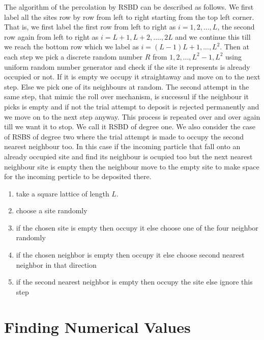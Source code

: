 The algorithm of the percolation by RSBD can be described as follows. We first label all the sites
row by row from left to right starting from the top left corner. That is, we first label the first row from
left to right as $i=1,2,...,L$, the second row again from left to right as $i=L+1,L+2,....,2L$
and we continue this till we reach the bottom row which we label as $i=(L-1)L+1,...,L^2$. 
Then at each step we pick a discrete random number $R$ from $1,2,...,L^2-1,L^2$ using uniform random number
generator and check if the site it represents is already occupied or not. If it is
empty we occupy it straightaway and move on to the next step. Else we pick one of its neighbours at random. 
The second attempt in the same step, that mimic the roll over mechanism, is successul if the neighbour
it picks is empty and if not the trial attempt to deposit is rejected permanently and we move on to the next 
step anyway. This process is
repeated over and over again till we want it to stop. We call it RSBD of degree one. We also consider
the case of RSBS of degree two where the trial attempt is made to occupy the second nearest neighbour too.
In this case if the incoming particle that fall onto an already occupied site and find its 
neighbour is ocupied too but the next nearest neighbour site is empty then the neighbour move to the empty
site to make space for the incoming perticle to be deposited there. 
\begin{enumerate}
	\item take a square lattice of length $L$.
	\item choose a site randomly
	\item if the chosen site is empty then occupy it else choose one of the four neighbor randomly
	\item if the chosen neighbor is empty then occupy it else choose second nearest neighbor in that direction
	\item if the second nearest neighbor is empty then occupy the site else ignore this step
\end{enumerate}


\section{Finding Numerical Values} 
\label{sect:finding-numerical-values}
